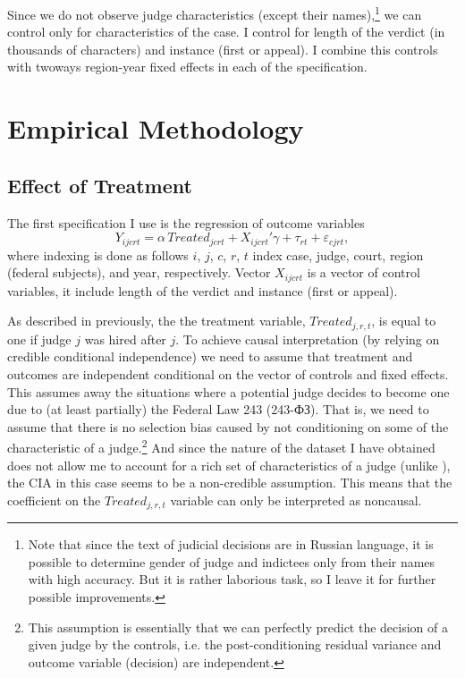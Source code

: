 \documentclass[12pt]{article}
\numberwithin{equation}{section}
\numberwithin{table}{section}
\numberwithin{figure}{section}
\begin{document}
Since we do not observe judge characteristics (except their names),\footnote{Note that since the text of judicial decisions are in Russian language, it is possible to determine gender of judge and indictees only from their names with high accuracy. But it is rather laborious task, so I leave it for further possible improvements.} we can control only for characteristics of the case. 
I control for length of the verdict (in thousands of characters) and instance (first or appeal). 
I combine this controls with twoways region-year fixed effects in each of the specification.



\section{Empirical Methodology}

\subsection{Effect of Treatment}



The first specification I use is the regression of outcome variables 
\begin{equation}
    Y_{ijcrt}=\alpha\, \textit{Treated}_{jcrt}+X_{ijcrt}'\gamma+\tau_{rt}+\varepsilon_{cjrt},\label{eq:treat}
\end{equation}
where indexing is done as follows $i$, $j$, $c$, $r$, $t$ index case, judge, court, region (federal subjects), and year, respectively. Vector $X_{ijcrt}$ is a vector of control variables, it include length of the verdict and instance (first or appeal).

As described in previously, the the treatment variable, $\textit{Treated}_{j,r,t}$, is equal to one if judge $j$ was hired after $j$. 
To achieve causal interpretation (by relying on credible conditional independence) we need to assume that treatment and outcomes are independent conditional on the vector of controls and fixed effects. 
This assumes away the situations where a potential judge decides to become one due to (at least partially) the Federal Law 243 (243-ФЗ).
That is, we need to assume that there is no selection bias caused by not conditioning on some of the characteristic of a judge.\footnote{This assumption is essentially that we can perfectly predict the decision of a given judge by the controls, i.e. the post-conditioning residual variance and outcome variable (decision) are independent.}
And since the nature of the dataset I have obtained does not allow me to account for a rich set of characteristics of a judge (unlike \citet{Mehmood2022}), the CIA in this case seems to be a non-credible assumption. 
This means that the coefficient on the $\textit{Treated}_{j,r,t}$ variable can only be interpreted as noncausal.
\end{document}
